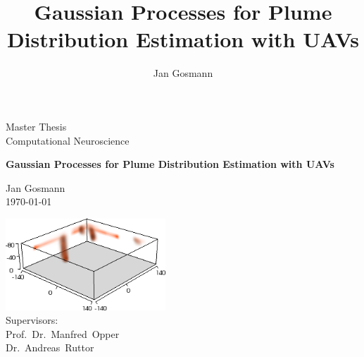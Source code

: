\documentclass[11pt,a4paper,twoside,BCOR=15mm,listof=totoc,parskip=never]{scrbook}
\title{Gaussian Processes for Plume Distribution Estimation with UAVs}
\author{Jan Gosmann}
\begin{document}
\frontmatter
\begin{titlepage}
    \begin{center}
        \vspace*{2.5cm}
        \begin{spacing}{2}
        \textsf{\Large Master Thesis\\Computational Neuroscience}\\
        \end{spacing}
        \vspace{1.0cm}
        \begin{spacing}{2.5}
            \textsf{\textbf{\huge Gaussian Processes for Plume Distribution 
                    Estimation with UAVs}}
        \end{spacing}
        \vspace{1.0cm}
        \Large
        \begin{spacing}{1.5}
            Jan Gosmann\\
            \today
        \end{spacing}
        \vspace{\fill}
        \includegraphics[width=6cm]{plots/vis_multi_dispersion}\\
        \vspace{\fill}
        Supervisors:\\
        Prof.~Dr.~Manfred~Opper\\
        Dr.~Andreas~Ruttor
    \end{center}
\end{titlepage}
\cleardoublepage{}
\end{document}
